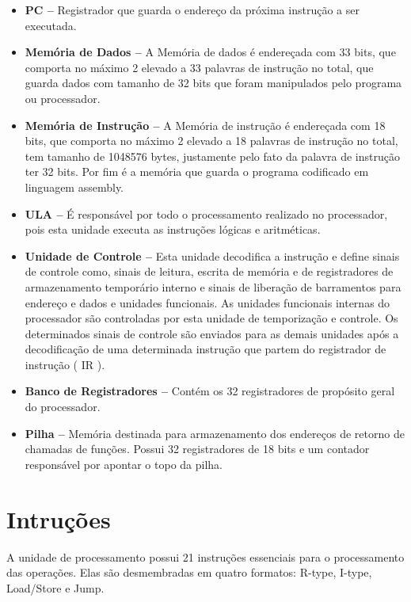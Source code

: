 \documentclass{report}
\begin{document}
  \begin{itemize}
    \item \textbf{PC --} Registrador que guarda o endereço da próxima instrução a ser executada.
    
    \item \textbf{Memória de Dados --} A Memória de dados é endereçada com 33 bits, que comporta no máximo 2 elevado a 33 palavras de instrução no total, que guarda dados com tamanho de 32 bits que foram manipulados pelo programa ou processador. 
   
    \item \textbf{Memória de Instrução --} A Memória de instrução é endereçada com 18 bits, que comporta no máximo 2 elevado a 18 palavras de instrução no total, tem tamanho de 1048576 bytes, justamente pelo fato da palavra de instrução ter 32 bits. Por fim é a memória que guarda o programa codificado em linguagem assembly.
    
    \item \textbf{ULA --} É responsável por todo o processamento realizado no processador, pois esta unidade executa as instruções lógicas e aritméticas.
    
    \item \textbf{Unidade de Controle --} Esta unidade decodifica a instrução e define sinais de controle como, sinais de leitura, escrita de memória e de registradores de armazenamento temporário interno e sinais de liberação de barramentos para endereço e dados e unidades funcionais. As unidades funcionais internas do processador são controladas por esta unidade de temporização e controle. Os determinados sinais de controle são enviados para as demais unidades após a decodificação de uma determinada instrução que partem do registrador de instrução ( IR ).
    
    \item \textbf{Banco de Registradores --} Contém os 32 registradores de propósito geral do processador.
    
    \item \textbf{Pilha --} Memória destinada para armazenamento dos endereços de retorno de chamadas de funções. Possui 32 registradores de 18 bits e um contador responsável por apontar o topo da pilha.
  \end{itemize}
  
  \section{Intruções}
  A unidade de processamento possui 21 instruções essenciais para o processamento das operações. Elas são desmembradas em quatro formatos: R-type, I-type, Load/Store e Jump.
  
\end{document}
